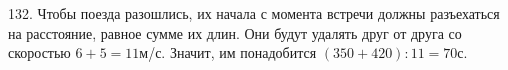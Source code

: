132. Чтобы поезда разошлись, их начала с момента встречи должны разъехаться на расстояние, равное сумме их длин. Они будут удалять друг от друга со скоростью $6+5=11$м/с. Значит, им понадобится $(350+420):11=70$с.\\
